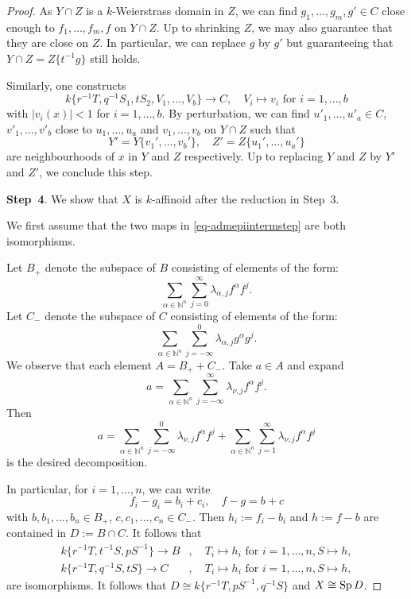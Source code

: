 \begin{proof}
    As $Y\cap Z$ is a $k$-Weierstrass domain in $Z$, we can find $g_1,\ldots,g_m,g'\in C$ close enough to $f_1,\ldots,f_m,f$ on $Y\cap Z$. Up to shrinking $Z$, we may also guarantee that they are close on $Z$. In particular, we can replace $g$ by $g'$ but guaranteeing that $Y\cap Z=Z\{t^{-1}g\}$ still holds.

    Similarly, one constructs 
    \[
        k\{r^{-1}T,q^{-1}S_1,tS_2,V_1,\ldots,V_b\}\rightarrow C,\quad V_i\mapsto v_i\text{ for }i=1,\ldots,b  
    \]
    with $|v_i(x)|<1$ for $i=1,\ldots,b$.
    By perturbation, we can find $u'_1,\ldots,u'_a\in C$, $v'_1,\ldots,v'_b$ close to $u_1,\ldots,u_a$ and $v_1,\ldots,v_b$ on $Y\cap Z$ such that 
    \[
        Y'=Y\{v_1',\ldots,v_b'\},\quad Z'=Z\{u_1',\ldots,u_a'\}  
    \]
    are neighbourhoods of $x$ in $Y$ and $Z$ respectively. Up to replacing $Y$ and $Z$ by $Y'$ and $Z'$, we conclude this step.
    
    \textbf{Step~4}. We show that $X$ is $k$-affinoid after the reduction in Step~3.

    We first assume that the two maps in \eqref{eq-admepiintermstep} are both isomorphisms.
    
    Let $B_+$ denote the subspace of $B$ consisting of elements of the form:
    \[
        \sum_{\alpha\in \mathbb{N}^n}\sum_{j=0}^{\infty} \lambda_{\alpha,j}f^{\alpha} f^j.  
    \]
    Let $C_-$ denote the subspace of $C$ consisting of elements of the form:
    \[
        \sum_{\alpha\in \mathbb{N}^n}\sum_{j=-\infty}^{0} \lambda_{\alpha,j}g^{\alpha} g^j.  
    \]
    We observe that each element $A=B_++C_-$. Take $a\in A$ and expand
    \[
        a=\sum_{\alpha\in \mathbb{N}^n}\sum_{j=-\infty}^{\infty} \lambda_{\nu,j}f^{\alpha}f^j.  
    \]
    Then 
    \[
        a=  \sum_{\alpha\in \mathbb{N}^n}\sum_{j=-\infty}^{0} \lambda_{\nu,j}f^{\alpha}f^j+\sum_{\alpha\in \mathbb{N}^n}\sum_{j=1}^{\infty} \lambda_{\nu,j}f^{\alpha}f^j  
    \]
    is the desired decomposition.

    In particular, for $i=1,\ldots,n$, we can write
    \[
        f_i-g_i=b_i+c_i,\quad f-g=b+c  
    \]
    with $b,b_1,\ldots,b_n\in B_+$, $c,c_1,\ldots,c_n\in C_-$. Then $h_i:=f_i-b_i$ and $h:=f-b$ are contained in $D:=B\cap C$. It follows that 
    \[
        \begin{aligned}
        k\{r^{-1}T,t^{-1}S,pS^{-1}\}\rightarrow B &,\quad T_i\mapsto h_i \text{ for } i=1,\ldots,n,S\mapsto h,\\
        k\{r^{-1}T,q^{-1}S,tS\}\rightarrow C &,\quad T_i\mapsto h_i \text{ for } i=1,\ldots,n,S\mapsto h,
        \end{aligned}
    \]
    are isomorphisms. It follows that $D\cong k\{r^{-1}T,pS^{-1},q^{-1}S\}$ and $X\cong \operatorname{Sp} D$.


\end{proof}

